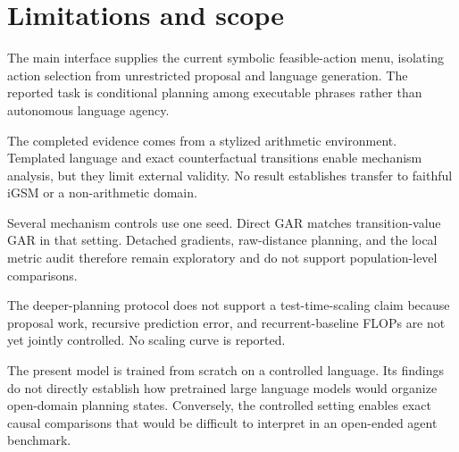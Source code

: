 \section{Limitations and scope}

The main interface supplies the current symbolic feasible-action menu, isolating action selection from unrestricted proposal and language generation. The reported task is conditional planning among executable phrases rather than autonomous language agency.

The completed evidence comes from a stylized arithmetic environment. Templated language and exact counterfactual transitions enable mechanism analysis, but they limit external validity. No result establishes transfer to faithful iGSM or a non-arithmetic domain.

Several mechanism controls use one seed. Direct GAR matches transition-value GAR in that setting. Detached gradients, raw-distance planning, and the local metric audit therefore remain exploratory and do not support population-level comparisons.

The deeper-planning protocol does not support a test-time-scaling claim because proposal work, recursive prediction error, and recurrent-baseline FLOPs are not yet jointly controlled. No scaling curve is reported.

The present model is trained from scratch on a controlled language. Its findings do not directly establish how pretrained large language models would organize open-domain planning states. Conversely, the controlled setting enables exact causal comparisons that would be difficult to interpret in an open-ended agent benchmark.
